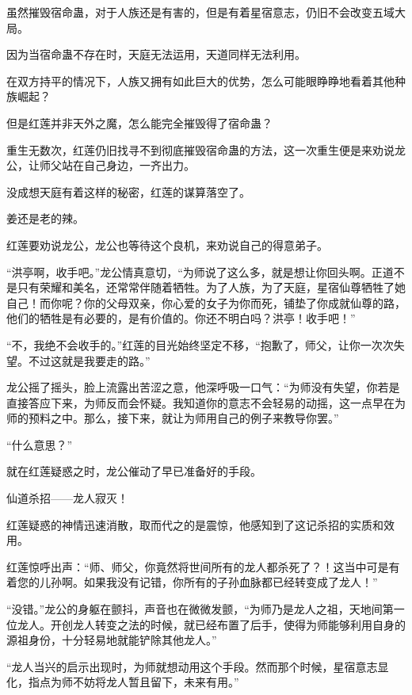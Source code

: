 
\begin{this_body}



虽然摧毁宿命蛊，对于人族还是有害的，但是有着星宿意志，仍旧不会改变五域大局。

因为当宿命蛊不存在时，天庭无法运用，天道同样无法利用。

在双方持平的情况下，人族又拥有如此巨大的优势，怎么可能眼睁睁地看着其他种族崛起？

但是红莲并非天外之魔，怎么能完全摧毁得了宿命蛊？

重生无数次，红莲仍旧找寻不到彻底摧毁宿命蛊的方法，这一次重生便是来劝说龙公，让师父站在自己身边，一齐出力。

没成想天庭有着这样的秘密，红莲的谋算落空了。

姜还是老的辣。

红莲要劝说龙公，龙公也等待这个良机，来劝说自己的得意弟子。

“洪亭啊，收手吧。”龙公情真意切，“为师说了这么多，就是想让你回头啊。正道不是只有荣耀和美名，还常常伴随着牺牲。为了人族，为了天庭，星宿仙尊牺牲了她自己！而你呢？你的父母双亲，你心爱的女子为你而死，铺垫了你成就仙尊的路，他们的牺牲是有必要的，是有价值的。你还不明白吗？洪亭！收手吧！”

“不，我绝不会收手的。”红莲的目光始终坚定不移，“抱歉了，师父，让你一次次失望。不过这就是我要走的路。”

龙公摇了摇头，脸上流露出苦涩之意，他深呼吸一口气：“为师没有失望，你若是直接答应下来，为师反而会怀疑。我知道你的意志不会轻易的动摇，这一点早在为师的预料之中。那么，接下来，就让为师用自己的例子来教导你罢。”

“什么意思？”

就在红莲疑惑之时，龙公催动了早已准备好的手段。

仙道杀招——龙人寂灭！

红莲疑惑的神情迅速消散，取而代之的是震惊，他感知到了这记杀招的实质和效用。

红莲惊呼出声：“师、师父，你竟然将世间所有的龙人都杀死了？！这当中可是有着您的儿孙啊。如果我没有记错，你所有的子孙血脉都已经转变成了龙人！”

“没错。”龙公的身躯在颤抖，声音也在微微发颤，“为师乃是龙人之祖，天地间第一位龙人。开创龙人转变之法的时候，就已经布置了后手，使得为师能够利用自身的源祖身份，十分轻易地就能铲除其他龙人。”

“龙人当兴的启示出现时，为师就想动用这个手段。然而那个时候，星宿意志显化，指点为师不妨将龙人暂且留下，未来有用。”


\end{this_body}
